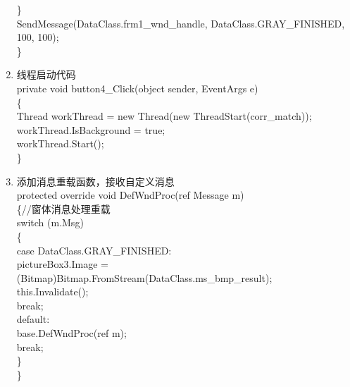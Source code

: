 ﻿\documentclass[12pt,a4paper,oneside]{book}
\begin{document}
\begin{enumerate}
\hspace*{2em}\}\\
\hspace*{2em}SendMessage(DataClass.frm1\_wnd\_handle, DataClass.GRAY\_FINISHED, 100, 100);\\
\hspace*{0em}\}\\

\item 线程启动代码\\
 \hspace*{4em}private void button4\_Click(object sender, EventArgs e)\\
\hspace*{4em}\{\\
\hspace*{6em}Thread workThread = new Thread(new ThreadStart(corr\_match));\\
\hspace*{6em}workThread.IsBackground = true;\\
\hspace*{6em}workThread.Start();  \\
\hspace*{4em}\}\\ 

\item 添加消息重载函数，接收自定义消息\\
\hspace*{0em}protected override void DefWndProc(ref Message m)\\
\hspace*{0em}\{//窗体消息处理重载\\
\hspace*{2em}switch (m.Msg)\\
\hspace*{2em}\{\\
\hspace*{4em}case DataClass.GRAY\_FINISHED: \\
\hspace*{4em}pictureBox3.Image = (Bitmap)Bitmap.FromStream(DataClass.ms\_bmp\_result);\\
\hspace*{6em}this.Invalidate();\\
\hspace*{6em}break;\\
\hspace*{4em}default:\\
\hspace*{6em}base.DefWndProc(ref m);\\
\hspace*{6em}break;\\
\hspace*{2em}\}\\
\hspace*{0em}\}\\


\end{enumerate}
\end{document}
